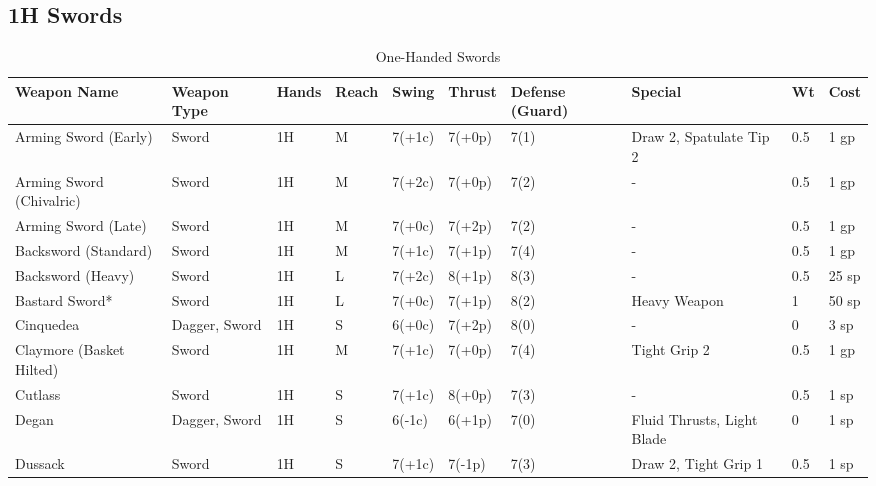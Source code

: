 \documentclass[oneside,11pt,english]{book}
\begin{document}
\subsection{1H Swords}
\begin{longtabu} to 1\linewidth {X[2,l]XX[-1,c]X[-1,c]XXX[-1,c]X[2,l]X[-3,c]X[-3,r]}
	\caption{One-Handed Swords}
	\label{tab:1H Swords}\\
Weapon Name					&Weapon Type    &Hands   &Reach  &Swing  &Thrust &Defense (Guard)  &Special                                 &Wt  &Cost\\\toprule\endhead
Arming Sword (Early)        &Sword          &1H      &M      &7(+1c) &7(+0p) &7(1)           &Draw 2, Spatulate Tip 2                 &0.5 &1 gp\\
Arming Sword (Chivalric)    &Sword          &1H      &M      &7(+2c) &7(+0p) &7(2)           &-                                       &0.5 &1 gp\\
Arming Sword (Late)         &Sword          &1H      &M      &7(+0c) &7(+2p) &7(2)           &-                                       &0.5 &1 gp\\
Backsword (Standard)        &Sword          &1H      &M      &7(+1c) &7(+1p) &7(4)           &-                                       &0.5 &1 gp\\
Backsword (Heavy)           &Sword          &1H      &L      &7(+2c) &8(+1p) &8(3)           &-                                       &0.5 &25 sp\\
Bastard Sword*              &Sword          &1H      &L      &7(+0c) &7(+1p) &8(2)           &Heavy Weapon                            &1   &50 sp\\
Cinquedea                   &Dagger, Sword  &1H      &S      &6(+0c) &7(+2p) &8(0)           &-                                       &0   &3 sp\\
Claymore (Basket Hilted)	&Sword		&1H      &M      &7(+1c) &7(+0p) &7(4)           &Tight Grip 2                           &0.5 &1 gp\\
Cutlass						&Sword          &1H      &S      &7(+1c) &8(+0p) &7(3)           &-                                       &0.5 &1 sp\\
Degan&Dagger, Sword  &1H      &S      &6(-1c) &6(+1p) &7(0)           &Fluid Thrusts, Light Blade              &0   &1 sp\\
Dussack                     &Sword          &1H      &S      &7(+1c) &7(-1p) &7(3)           &Draw 2, Tight Grip 1                    &0.5 &1 sp\\

\end{longtabu}
\end{document}
